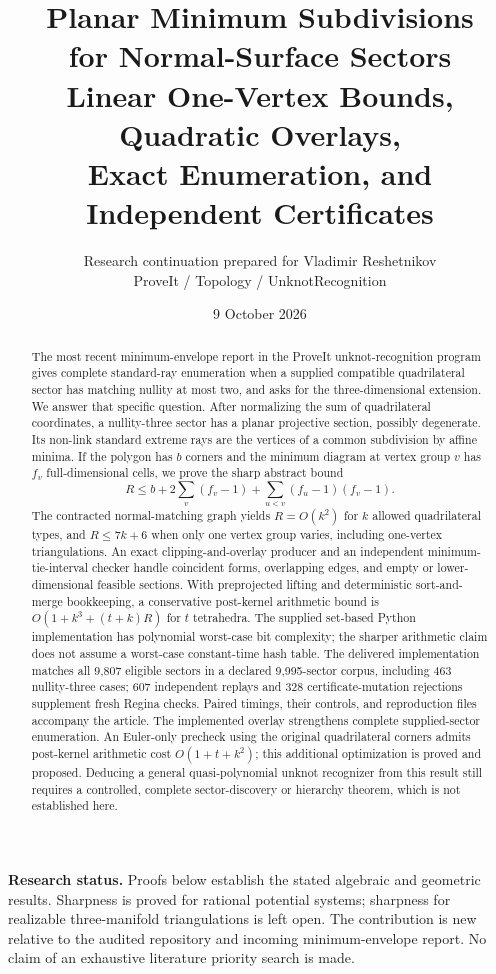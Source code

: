 \documentclass[11pt,letterpaper]{article}
\title{\color{ink}\bfseries Planar Minimum Subdivisions\protect\\
for Normal-Surface Sectors\protect\\[5pt]
\large Linear One-Vertex Bounds, Quadratic Overlays,\protect\\
Exact Enumeration, and Independent Certificates}
\author{Research continuation prepared for Vladimir Reshetnikov\\
\small ProveIt / Topology / UnknotRecognition}
\date{9 October 2026}
\theoremstyle{definition}
\theoremstyle{remark}\newtheorem{remark}[theorem]{Remark}
\begin{document}
\maketitle
\begin{abstract}
The most recent minimum-envelope report in the ProveIt unknot-recognition
program gives complete standard-ray enumeration when a supplied compatible
quadrilateral sector has matching nullity at most two, and asks for the
three-dimensional extension. We answer that specific question. After
normalizing the sum of quadrilateral coordinates, a nullity-three sector
has a planar projective section, possibly degenerate. Its non-link standard
extreme rays are the vertices of a common subdivision by affine minima. If the polygon has $b$ corners
and the minimum diagram at vertex group $v$ has $f_v$ full-dimensional cells,
we prove the sharp abstract bound
\[
 R\le b+2\sum_v(f_v-1)+\sum_{u<v}(f_u-1)(f_v-1).
\]
The contracted normal-matching graph yields $R=O(k^2)$ for $k$ allowed
quadrilateral types, and $R\le7k+6$ when only one vertex group varies,
including one-vertex triangulations. An exact clipping-and-overlay producer
and an independent minimum-tie-interval checker handle coincident forms,
overlapping edges, and empty or lower-dimensional feasible sections. With
preprojected lifting and deterministic sort-and-merge bookkeeping, a
conservative post-kernel arithmetic bound is $O(1+k^3+(t+k)R)$ for $t$
tetrahedra. The supplied set-based Python implementation has polynomial
worst-case bit complexity; the sharper arithmetic claim does not assume
a worst-case constant-time hash table. The delivered implementation matches all
9,807 eligible sectors in a declared 9,995-sector corpus, including 463
nullity-three cases; 607 independent replays and 328 certificate-mutation
rejections supplement fresh Regina checks. Paired timings, their controls,
and reproduction files accompany the article. The implemented overlay
strengthens complete supplied-sector enumeration. An Euler-only precheck
using the original quadrilateral corners admits post-kernel arithmetic
cost $O(1+t+k^2)$; this additional optimization is proved and proposed. Deducing a general quasi-polynomial
unknot recognizer from this result still requires a controlled, complete
sector-discovery or hierarchy theorem, which is not established here.
\end{abstract}

\noindent\textbf{Research status.} Proofs below establish the stated algebraic
and geometric results. Sharpness is proved for rational potential systems;
sharpness for realizable three-manifold triangulations is left open.
The contribution is new relative to the audited repository and incoming
minimum-envelope report. No claim of an exhaustive literature priority
search is made.
\end{document}
